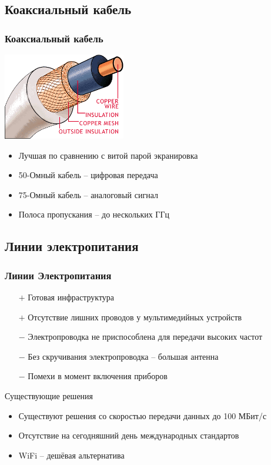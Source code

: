 \documentclass[utf8]{beamer}
\begin{document}
\subsection{Коаксиальный кабель}
\begin{frame}
\frametitle{Коаксиальный кабель}
\begin{center}
\includegraphics[width=0.4\textwidth]{pics/coax.png}
\end{center}
\begin{itemize}
 \item Лучшая по сравнению с витой парой экранировка
 \item 50-Омный кабель -- цифровая передача
 \item 75-Омный кабель -- аналоговый сигнал
 \item Полоса пропускания -- до нескольких ГГц
\end{itemize}
\end{frame}
\subsection{Линии электропитания}
\begin{frame}
\frametitle{Линии Электропитания}
\begin{itemize}
 \item [$+$] Готовая инфраструктура
 \item [$+$] Отсутствие лишних проводов у мультимедийных устройств
 \item [$-$] Электропроводка не приспособлена для передачи высоких частот
 \item [$-$] Без скручивания электропроводка -- большая антенна
 \item [$-$] Помехи в момент включения приборов
\end{itemize}
\begin{block}{Существующие решения}
\begin{itemize}
 \item Существуют решения со скоростью передачи данных до 100 МБит/с
 \item Отсутствие на сегодняшний день международных стандартов
 \item WiFi -- дешёвая альтернатива
\end{itemize}

\end{block}

\end{frame}
\end{document}
